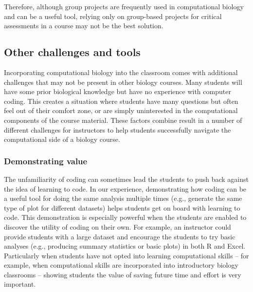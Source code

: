 Therefore, although group projects are frequently used in computational biology and can be a useful tool, relying only on group-based projects for critical assessments in a course may not be the best solution.



\subsection{Other challenges and tools}

Incorporating computational biology into the classroom comes with additional challenges that may not be present in other biology courses.
Many students will have some prior biological knowledge but have no experience with computer coding.
This creates a situation where students have many questions but often feel out of their comfort zone, or are simply uninterested in the computational components of the course material.
These factors combine result in a number of different challenges for instructors to help students successfully navigate the computational side of a biology course.

\subsubsection{Demonstrating value}
The unfamiliarity of coding can sometimes lead the students to push back against the idea of learning to code.
In our experience, demonstrating how coding can be a useful tool for doing the same analysis multiple times (e.g., generate the same type of plot for different datasets) helps students get on board with learning to code. 
This demonstration is especially powerful when the students are enabled to discover the utility of coding on their own. 
For example, an instructor could provide students with a large dataset and encourage the students to try basic analyses (e.g., producing summary statistics or basic plots) in both R and Excel. 
Particularly when students have not opted into learning computational skills -- for example, when computational skills are incorporated into introductory biology classrooms -- showing students the value of saving future time and effort is very important. 


